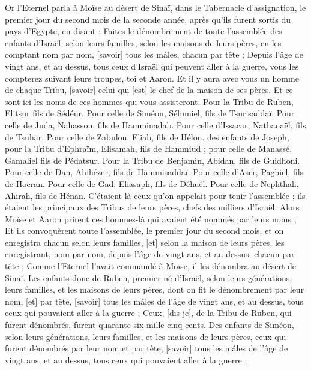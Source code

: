 \BFont
\begin{multicols}{2}
\VerseOne{}Or l'Eternel parla à Moïse au désert de Sinaï, dans le Tabernacle d'assignation, le premier jour du second mois de la seconde année, après qu'ils furent sortis du pays d'Egypte, en disant :
Faites le dénombrement de toute l'assemblée des enfants d'Israël, selon leurs familles, selon les maisons de leurs pères, en les comptant nom par nom, [savoir] tous les mâles, chacun par tête ;
Depuis l'âge de vingt ans, et au dessus, tous ceux d'Israël qui peuvent aller à la guerre, vous les compterez suivant leurs troupes, toi et Aaron.
Et il y aura avec vous un homme de chaque Tribu, [savoir] celui qui [est] le chef de la maison de ses pères.
Et ce sont ici les noms de ces hommes qui vous assisteront. Pour la Tribu de Ruben, Elitsur fils de Sédéur.
Pour celle de Siméon, Sélumiel, fils de Tsurisaddaï.
Pour celle de Juda, Nahasson, fils de Hamminadab.
Pour celle d'Issacar, Nathanaël, fils de Tsuhar.
Pour celle de Zabulon, Eliab, fils de Hélon.
des enfants de Joseph, pour la Tribu d'Ephraïm, Elisamah, fils de Hammiud ; pour celle de Manassé, Gamaliel fils de Pédatsur.
Pour la Tribu de Benjamin, Abidan, fils de Guidhoni.
Pour celle de Dan, Ahihézer, fils de Hammisaddaï.
Pour celle d'Aser, Paghiel, fils de Hocran.
Pour celle de Gad, Eliasaph, fils de Déhuël.
Pour celle de Nephthali, Ahirah, fils de Hénan.
C'étaient là ceux qu'on appelait pour tenir l'assemblée ; ils étaient les principaux des Tribus de leurs pères, chefs des milliers d'Israël.
Alors Moïse et Aaron prirent ces hommes-là qui avaient été nommés par leurs noms ;
Et ils convoquèrent toute l'assemblée, le premier jour du second mois, et on enregistra chacun selon leurs familles, [et] selon la maison de leurs pères, les enregistrant, nom par nom, depuis l'âge de vingt ans, et au dessus, chacun par tête ;
Comme l'Eternel l'avait commandé à Moïse, il les dénombra au désert de Sinaï.
Les enfants donc de Ruben, premier-né d'Israël, selon leurs générations, leurs familles, et les maisons de leurs pères, dont on fit le dénombrement par leur nom, [et] par tête, [savoir] tous les mâles de l'âge de vingt ans, et au dessus, tous ceux qui pouvaient aller à la guerre ;
Ceux, [dis-je], de la Tribu de Ruben, qui furent dénombrés, furent quarante-six mille cinq cents.
Des enfants de Siméon, selon leurs générations, leurs familles, et les maisons de leurs pères, ceux qui furent dénombrés par leur nom et par tête, [savoir] tous les mâles de l'âge de vingt ans, et au dessus, tous ceux qui pouvaient aller à la guerre ;

\end{multicols}
